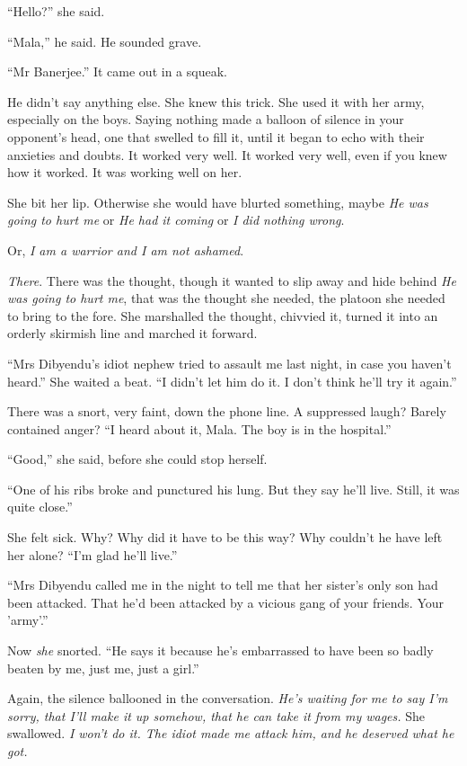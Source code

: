 ``Hello?'' she said.

``Mala,'' he said. He sounded grave.

``Mr Banerjee.'' It came out in a squeak.

He didn't say anything else. She knew this trick. She used it with
her army, especially on the boys. Saying nothing made a balloon of
silence in your opponent's head, one that swelled to fill it, until
it began to echo with their anxieties and doubts. It worked very
well. It worked very well, even if you knew how it worked. It was
working well on her.

She bit her lip. Otherwise she would have blurted something, maybe
\emph{He was going to hurt me} or \emph{He had it coming} or
\emph{I did nothing wrong}.

Or, \emph{I am a warrior and I am not ashamed}.

\emph{There}. There was the thought, though it wanted to slip away
and hide behind \emph{He was going to hurt me}, that was the
thought she needed, the platoon she needed to bring to the fore.
She marshalled the thought, chivvied it, turned it into an orderly
skirmish line and marched it forward.

``Mrs Dibyendu's idiot nephew tried to assault me last night, in
case you haven't heard.'' She waited a beat. ``I didn't let him do
it. I don't think he'll try it again.''

There was a snort, very faint, down the phone line. A suppressed
laugh? Barely contained anger? ``I heard about it, Mala. The boy is
in the hospital.''

``Good,'' she said, before she could stop herself.

``One of his ribs broke and punctured his lung. But they say he'll
live. Still, it was quite close.''

She felt sick. Why? Why did it have to be this way? Why couldn't he
have left her alone? ``I'm glad he'll live.''

``Mrs Dibyendu called me in the night to tell me that her sister's
only son had been attacked. That he'd been attacked by a vicious
gang of your friends. Your 'army'.''

Now \emph{she} snorted. ``He says it because he's embarrassed to
have been so badly beaten by me, just me, just a girl.''

Again, the silence ballooned in the conversation.
\emph{He's waiting for me to say I'm sorry, that I'll make it up somehow, that he can take it from my wages.}
She swallowed.
\emph{I won't do it. The idiot made me attack him, and he deserved what he got.}

